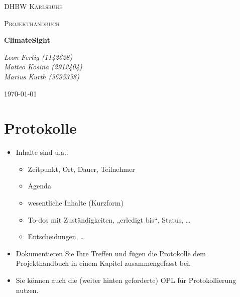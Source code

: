 \documentclass[12pt]{article}
\begin{document}

\begin{titlepage}
	\centering
	{\scshape\LARGE DHBW Karlsruhe\par}
	\vspace{1cm}
	{\scshape\Large Projekthandbuch\par}
	\vspace{1.5cm}
	{\huge\bfseries ClimateSight\par}
	\vspace{2cm}
	{\Large\itshape Leon Fertig (1142628)\\Matteo Kosina (2912404)\\Marius Kurth (3695338)\par}
	\vfill
	\vfill

	{\large \today\par}
\end{titlepage}

\tableofcontents
\thispagestyle{empty}
\newpage

\setcounter{page}{1}


\section{Protokolle}
\begin{itemize}
	\item Inhalte sind u.a.:
	\begin{itemize}
		\item Zeitpunkt, Ort, Dauer, Teilnehmer
		\item Agenda
		\item wesentliche Inhalte (Kurzform)
		\item To-dos mit Zuständigkeiten, „erledigt bis“, Status, …
		\item Entscheidungen, …
	\end{itemize}
	\item Dokumentieren Sie Ihre Treffen und fügen die Protokolle dem Projekthandbuch in einem Kapitel
	zusammengefasst bei.
	\item Sie können auch die (weiter hinten geforderte) OPL für Protokollierung nutzen.
\end{itemize}
\end{document}
